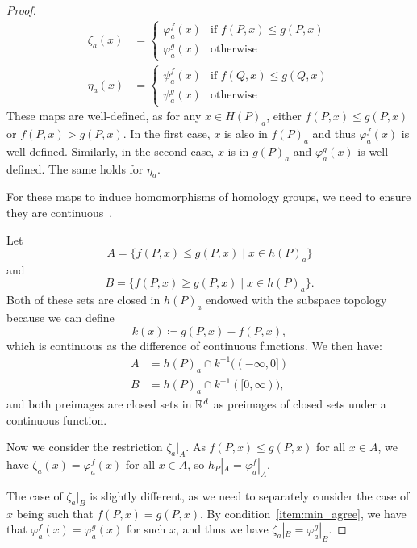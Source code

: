 \begin{proof}
\begin{align}
        \zeta_a(x) &= \begin{cases}
            \varphi^f_a(x) & \text{if } f(P, x) \leq g(P, x) \\
            \varphi^g_a(x) & \text{otherwise}
        \end{cases} \\
        \eta_a(x) &= \begin{cases}
            \psi^f_a(x) & \text{if } f(Q, x) \leq g(Q, x) \\
            \psi^g_a(x) & \text{otherwise}
        \end{cases}
    \end{align}
    These maps are well-defined, as for any $x \in H(P)_a$,
    either $f(P, x) \leq g(P, x)$ or $f(P, x) > g(P, x)$.
    In the first case, $x$ is also in $f(P)_a$ and thus $\varphi_a^f(x)$ is
    well-defined. Similarly, in the second case, $x$ is in $g(P)_a$ and
    $\varphi_a^g(x)$ is well-defined. The same holds for $\eta_a$.
    
    For these maps to induce homomorphisms of homology groups, we need to ensure
    they are continuous~\cite{hatcher2005algebraic}.

    Let
    \begin{equation}
        A = \{f(P, x) \leq g(P, x) \mid x \in h(P)_a\}  
    \end{equation}
    and
    \begin{equation}
        B = \{f(P, x) \geq g(P, x) \mid x \in h(P)_a\}.
    \end{equation}
    Both of these sets are closed in $h(P)_a$ endowed with the subspace topology
    because we can define
    \begin{equation}
        k(x) \coloneqq g(P, x) - f(P, x),
    \end{equation}
    which is continuous as the difference of continuous functions.
    We then have:
    \begin{align}
        A &= h(P)_a \cap k^{-1}((-\infty, 0]) \\
        B &= h(P)_a \cap k^{-1}([0, \infty)),
    \end{align}
    and both preimages are closed sets in $\mathbb{R}^d$ as preimages of closed sets
    under a continuous function.
    
    Now we consider the restriction $\zeta_a|_A$.
    As $f(P, x) \leq g(P, x)$ for all $x \in A$, we have $\zeta_a(x) = \varphi_a^f(x)$
    for all $x \in A$, so $h_P|_A = \varphi_a^f|_A$.
    
    The case of $\zeta_a|_B$ is slightly different, as we need to separately
    consider the case of $x$ being such that $f(P, x) = g(P, x)$.
    By condition~\ref{item:min_agree}, we have that $\varphi_a^f(x) =
    \varphi_a^g(x)$ for such $x$, and thus we have $\zeta_a|_B =
    \varphi_a^g|_B$.


\end{proof}
